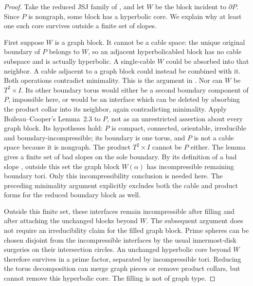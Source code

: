 \documentclass[11pt]{article}
\begin{document}
\begin{proof}
Take the reduced JSJ family of \cite[pp.~50--51]{bc}, and let $W$ be
the block incident to $\partial P$. Since $P$ is nongraph, some block
has a hyperbolic core. We explain why at least one such core survives
outside a finite set of slopes.

First suppose $W$ is a graph block. It cannot be a cable space:
the unique original boundary of $P$ belongs to $W$, so an adjacent
hyperbolicabled block has no cable subspace and is actually
hyperbolic. A single-cable $W$ could be absorbed into that neighbor.
A cable adjacent to a graph block could instead be combined with it.
Both operations contradict minimality. This is the argument in
\cite[proof of Lemma~2.3, p.~51]{bc}.
Nor can $W$ be $T^2\times I$. Its other boundary torus would either
be a second boundary component of $P$, impossible here, or would be
an interface which can be deleted by absorbing the product collar
into its neighbor, again contradicting minimality.
Apply Boileau--Cooper's Lemma~2.3 to $P$, not as an unrestricted
assertion about every graph block. Its hypotheses hold: $P$ is
compact, connected, orientable, irreducible and boundary-incompressible;
its boundary is one torus, and $P$ is not a cable space because it is
nongraph. The product $T^2\times I$ cannot be $P$ either.
The lemma gives a finite set of bad slopes on the sole boundary.
By its definition of a bad slope \cite[printed p.~51]{bc}, outside
this set the graph block $W(\alpha)$ has incompressible remaining
boundary tori. Only this incompressibility conclusion is needed here.
The preceding minimality argument explicitly excludes both the cable
and product forms for the reduced boundary block as well.

Outside this finite set, these interfaces remain incompressible after
filling and after attaching the unchanged blocks beyond $W$.
The subsequent argument does not require an irreducibility claim
for the filled graph block. Prime spheres can
be chosen disjoint from the incompressible interfaces by the usual
innermost-disk surgeries on their intersection circles. An unchanged
hyperbolic core beyond $W$ therefore survives in a prime factor,
separated by incompressible tori. Reducing the torus decomposition
can merge graph pieces or remove product collars, but cannot remove
this hyperbolic core. The filling is not of graph type.


\end{proof}
\end{document}
